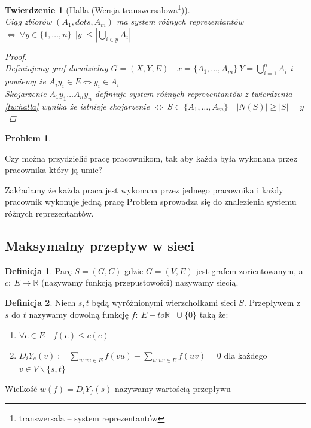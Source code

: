 \documentclass[12pt,a4paper]{article}
\newtheorem{tw}{Twierdzenie}
\theoremstyle{definition}
\newtheorem{df}{Definicja}
\newtheorem{problem}{Problem}
\begin{document}
\begin{tw}[\href{http://pl.wikipedia.org/wiki/Philip_Hall}{Halla} (Wersja transwersalowa\footnote{transwersala -- system reprezentantów})]~\\
Ciąg zbiorów $(A_1, dots , A_m)$  ma system różnych reprezentantów $\Leftrightarrow ~ \forall y\in\{1,\dots ,n\} ~~ |y| \leqslant |\bigcup\limits_{i\in y} A_i|$
\begin{proof}~\\
Definiujemy graf dwudzielny $G=(X,Y,E) \quad x = \{A_1, \dots , A_m\} ~ Y = \bigcup\limits_{i=1}^n A_i $ i powiemy że $A_iy_i\in E \Leftrightarrow y_i \in A_i$\\
Skojarzenie $A_1y_1 \dots A_ny_n$ definiuje system różnych reprezentantów z twierdzenia \ref{tw:halla} wynika że istnieje skojarzenie $\Leftrightarrow ~ S\subset \{A_1, \dots , A_m\} \quad |N(S)| \geqslant |S| = y$
\end{proof}
\end{tw}

\begin{problem}
\begin{center}
Czy można przydzielić pracę pracownikom, tak aby każda była wykonana przez pracownika który ją umie?\\
\end{center}
Zakładamy że każda praca jest wykonana przez jednego pracownika i każdy pracownik wykonuje jedną pracę
Problem sprowadza się do znalezienia systemu różnych reprezentantów.
\end{problem}

\subsection{Maksymalny przepływ w sieci}
\begin{df}
Parę $S = (G,C)$ gdzie $G=(V,E)$ jest grafem zorientowanym, a $c: ~E\to \mathbb{R}$ (nazywamy funkcją przepustowości) nazywamy siecią.
\end{df}

\begin{df}
Niech $s,t$ będą wyróżnionymi wierzchołkami sieci $S$. Przepływem z $s$ do $t$ nazywamy dowolną funkcję $f: ~ E-to \mathbb{R_+} \cup \{0\}$ taką że:
\begin{enumerate}
	\item $\forall e\in E \quad f(e) \leqslant c(e)$
	\item $D_iY_e(v) := \sum\limits_{u: vu\in E} f(vu) - \sum\limits_{u: uv\in E}f(uv) = 0 $ dla każdego $v\in V \smallsetminus \{s, t\}$ 
\end{enumerate}
Wielkość $w(f) = D_iY_f(s)$ nazywamy wartością przepływu
\end{df}
\end{document}
